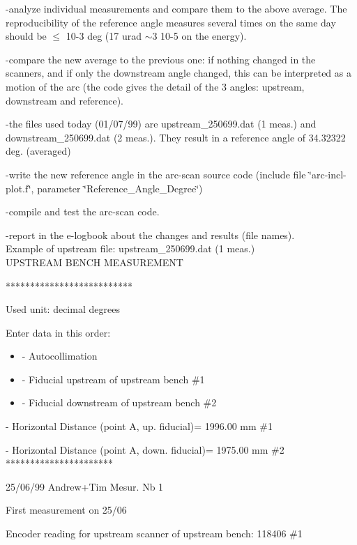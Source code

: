 -analyze individual measurements and compare them to the above average. The
reproducibility of the reference angle measures several times on the same day
should be $\leq$ 10-3 deg (17 urad \( \sim  \)3 10-5 on the energy). 

-compare the new average to the previous one: if nothing changed in the scanners,
and if only the downstream angle changed, this can be interpreted as a motion
of the arc (the code gives the detail of the 3 angles: upstream, downstream
and reference). 

-the files used today (01/07/99) are upstream\_250699.dat (1 meas.) and downstream\_250699.dat
(2 meas.). They result in a reference angle of 34.32322 deg. (averaged) 

-write the new reference angle in the arc-scan source code (include file \char`\"{}arc-incl-plot.f\char`\"{},
parameter \char`\"{}Reference\_Angle\_Degree\char`\"{}) 

-compile and test the arc-scan code. 

-report in the e-logbook about the changes and results (file names).\\


Example of upstream file: upstream\_250699.dat (1 meas.)\\


UPSTREAM BENCH MEASUREMENT 

{*}{*}{*}{*}{*}{*}{*}{*}{*}{*}{*}{*}{*}{*}{*}{*}{*}{*}{*}{*}{*}{*}{*}{*}{*}{*} 

Used unit: decimal degrees 

Enter data in this order: 

\begin{itemize}
\item - Autocollimation 
\item - Fiducial upstream of upstream bench \#1 
\item - Fiducial downstream of upstream bench \#2 
\end{itemize}
- Horizontal Distance (point A, up. fiducial)= 1996.00 mm \#1 

- Horizontal Distance (point A, down. fiducial)= 1975.00 mm \#2 \\


{*}{*}{*}{*}{*}{*}{*}{*}{*}{*}{*}{*}{*}{*}{*}{*}{*}{*}{*}{*}{*}{*} 

25/06/99 Andrew+Tim Mesur. Nb 1 

First measurement on 25/06 

Encoder reading for upstream scanner of upstream bench: 118406 \#1 

